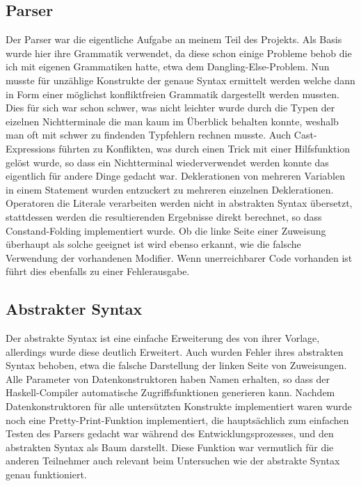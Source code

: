 \documentclass{article}
\begin{document}
  \subsection{Parser}
  Der Parser war die eigentliche Aufgabe an meinem Teil des Projekts. Als Basis wurde hier ihre Grammatik verwendet, da diese schon einige Probleme behob die ich mit eigenen Grammatiken hatte, etwa dem Dangling-Else-Problem. Nun musste für unzählige Konstrukte der genaue Syntax ermittelt werden welche dann in Form einer möglichst konfliktfreien Grammatik dargestellt werden mussten. Dies für sich war schon schwer, was nicht leichter wurde durch die Typen der eizelnen Nichtterminale die man kaum im Überblick behalten konnte, weshalb man oft mit schwer zu findenden Typfehlern rechnen musste. Auch Cast-Expressions führten zu Konflikten, was durch einen Trick mit einer Hilfsfunktion gelöst wurde, so dass ein Nichtterminal wiederverwendet werden konnte das eigentlich für andere Dinge gedacht war. Deklerationen von mehreren Variablen in einem Statement wurden entzuckert zu mehreren einzelnen Deklerationen. Operatoren die Literale verarbeiten werden nicht in abstrakten Syntax übersetzt, stattdessen werden die resultierenden Ergebnisse direkt berechnet, so dass Constand-Folding implementiert wurde. Ob die linke Seite einer Zuweisung überhaupt als solche geeignet ist wird ebenso erkannt, wie die falsche Verwendung der vorhandenen Modifier. Wenn unerreichbarer Code vorhanden ist führt dies ebenfalls zu einer Fehlerausgabe.
  \subsection{Abstrakter Syntax}
  Der abstrakte Syntax ist eine einfache Erweiterung des von ihrer Vorlage, allerdings wurde diese deutlich Erweitert. Auch wurden Fehler ihres abstrakten Syntax behoben, etwa die falsche Darstellung der linken Seite von Zuweisungen. Alle Parameter von Datenkonstruktoren haben Namen erhalten, so dass der Haskell-Compiler automatische Zugriffsfunktionen generieren kann. Nachdem Datenkonstruktoren für alle untersützten Konstrukte implementiert waren wurde noch eine Pretty-Print-Funktion implementiert, die hauptsächlich zum einfachen Testen des Parsers gedacht war während des Entwicklungsprozesses, und den abstrakten Syntax als Baum darstellt. Diese Funktion war vermutlich für die anderen Teilnehmer auch relevant beim Untersuchen wie der abstrakte Syntax genau funktioniert.
\end{document}
